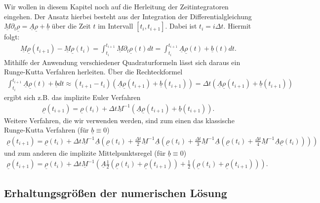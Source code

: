 Wir wollen in diesem Kapitel noch auf die Herleitung der Zeitintegratoren eingehen. Der Ansatz hierbei besteht aus der 
Integration der Differentialgleichung $\underline{M} \partial_t \underline{\rho} = \underline{A} \underline{\rho} + \underline{b}$ über die Zeit $t$ im Intervall $[t_i, t_{i+1}]$.
Dabei ist $t_i = i \Delta t$. Hiermit folgt:
\begin{align*}
  \underline{M}\underline{\rho}(t_{i+1}) - \underline{M}\underline{\rho}(t_i) = \int_{t_i}^{t_{i+1}}
  \underline{M} \partial_t \underline{\rho}(t) dt =\int_{t_i}^{t_{i+1}} \underline{A} \underline{\rho}(t) + \underline{b}(t) dt.
\end{align*}
Mithilfe der Anwendung verschiedener Quadraturformeln lässt sich daraus ein Runge-Kutta Verfahren herleiten. Über die Rechteckformel 
\begin{align*}
  \int_{t_i}^{t_{i+1}}\underline{A} \underline{\rho}(t) + \underline{b} dt \approx (t_{i+1}-t_i)( 
  \underline{A} \underline{\rho}(t_{i+1}) + \underline{b}(t_{i+1})) = \Delta t (\underline{A} \underline{\rho}(t_{i+1}) + \underline{b}(t_{i+1}))
\end{align*}
ergibt sich z.B. das implizite Euler Verfahren
\begin{align*}
  \underline{\rho}(t_{i+1}) = \underline{\rho}(t_{i}) + \Delta t \underline{M}^{-1}(\underline{A} \underline{\rho}(t_{i+1}) + \underline{b}(t_{i+1})).
\end{align*}
Weitere Verfahren, die wir verwenden werden, sind zum einen das
klassische Runge-Kutta Verfahren (für $\underline{b} \equiv 0$)
\begin{align*}
  \underline{\rho}(t_{i+1}) = \underline{\rho}(t_{i}) +
  \Delta t \underline{M}^{-1}\underline{A} (
  \underline{\rho}(t_{i}) +
  \frac{\Delta t}{2} \underline{M}^{-1}\underline{A} (
  \underline{\rho}(t_{i}) +
  \frac{\Delta t}{3} \underline{M}^{-1}\underline{A} (
  \underline{\rho}(t_{i}) +
  \frac{\Delta t}{4} \underline{M}^{-1}\underline{A} 
  \underline{\rho}(t_{i}) )))
\end{align*}
und zum anderen die implizite Mittelpunktsregel 
(für $\underline{b} \equiv 0$)
\begin{align*}
  \underline{\rho}(t_{i+1}) = \underline{\rho}(t_{i}) +
  \Delta t \underline{M}^{-1} (
  \underline{A} 
  \frac{1}{2}(\underline{\rho}(t_{i}) +
  \underline{\rho}(t_{i+1}) )
  +
  \frac{1}{2} ( \underline{\rho}(t_{i}) +
  \underline{\rho}(t_{i+1}) )).
\end{align*}

\subsection{Erhaltungsgrößen der numerischen Lösung}

